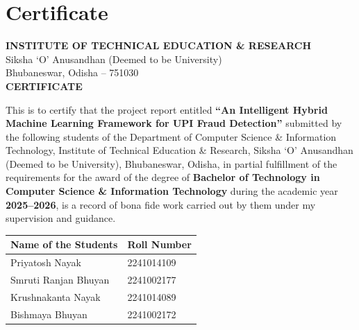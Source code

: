 \chapter*{Certificate}
\thispagestyle{empty}

\begin{center}

{\large \textbf{INSTITUTE OF TECHNICAL EDUCATION \& RESEARCH}}\\[0.05in]
{\normalsize Siksha `O' Anusandhan (Deemed to be University)}\\
{\normalsize Bhubaneswar, Odisha -- 751030}\\[0.35in]

{\Large \textbf{CERTIFICATE}}

\end{center}

\vspace{0.25in}

\noindent
This is to certify that the project report entitled
\textbf{``An Intelligent Hybrid Machine Learning Framework for UPI Fraud Detection''}
submitted by the following students of the Department of Computer Science \& Information Technology, Institute of Technical Education \& Research, Siksha `O' Anusandhan (Deemed to be University), Bhubaneswar, Odisha, in partial fulfillment of the requirements for the award of the degree of \textbf{Bachelor of Technology in Computer Science \& Information Technology} during the academic year \textbf{2025--2026}, is a record of bona fide work carried out by them under my supervision and guidance.

\vspace{0.3in}

\begin{center}

\renewcommand{\arraystretch}{1.2}

\begin{tabular}{|p{8cm}|p{4cm}|}

\hline

\centering \textbf{Name of the Students} &
\centering \textbf{Roll Number}
\tabularnewline

\hline

Priyatosh Nayak & 2241014109 \\
\hline

Smruti Ranjan Bhuyan & 2241002177 \\
\hline

Krushnakanta Nayak & 2241014089 \\
\hline

Bishmaya Bhuyan & 2241002172 \\
\hline

\end{tabular}

\end{center}

